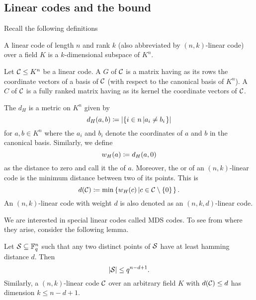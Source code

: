 \subsection{Linear codes and the  bound}

Recall the following definitions

\begin{definition}
    A linear code of length $n$ and rank $k$ (also abbreviated by $(n,k)$-linear code) over a field $K$ is a $k$-dimensional subspace of $K^n$.  
\end{definition}

\begin{definition}
    Let $\mathcal{C}\leq K^n$ be a linear code. A  $G$ of $\mathcal{C}$ is a matrix having as its rows the coordinate vectors of a basis of $\mathcal{C}$ (with respect to the canonical basis of $K^n$). A  $C$ of $\mathcal{C}$ is a fully ranked matrix having as its kernel the coordinate vectors of $\mathcal{C}$.
\end{definition}

\begin{definition}
    The  $d_H$ is a metric on $K^n$ given by
    $$
    d_H(a,b)\defeq\card{\set{i\in n}[a_i\neq b_i]}
    $$
    for $a,b\in K^n$ where the $a_i$ and $b_i$ denote the coordinates of $a$ and $b$ in the canonical basis.
    Similarly, we define
    $$
    w_H(a)\mathrel{\mathrel{\mathop:}\mkern-1.2mu=} d_H(a,0)
    $$
    as the  distance to zero and call it the  of $a$.
    Moreover, the  or  of an $(n,k)$-linear code is the minimum  distance between two of its points.
    This is
    $$
    d(\cC)\defeq \min\set{w_H(c)}[c\in\cC\setminus\set{0}].
    $$
    An $(n,k)$-linear code with  weight $d$ is also denoted as an $(n,k,d)$-linear code.
\end{definition}

We are interested in special linear codes called MDS codes. To see from where they arise, consider the following lemma.

\begin{lemma}
    Let $\mathcal{S}\subseteq \mathbb{F}_{q}^n$ such that any two distinct points of $\mathcal{S}$ have at least hamming distance $d$. Then
    $$
    \left|\mathcal{S}\right|\leq q^{n-d+1}.
    $$
    Similarly, a $(n,k)$-linear code $\mathcal{C}$ over an arbitrary field $K$ with $d(\mathcal{C})\leq d$ has dimension $k\leq n-d+1$.
\end{lemma}

